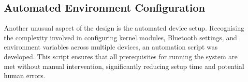 \subsection*{Automated Environment Configuration}

Another unusual aspect of the design is the automated device setup. Recognising the complexity involved in configuring kernel modules, Bluetooth settings, and environment variables across multiple devices, an automation script was developed. This script ensures that all prerequisites for running the system are met without manual intervention, significantly reducing setup time and potential human errors.





